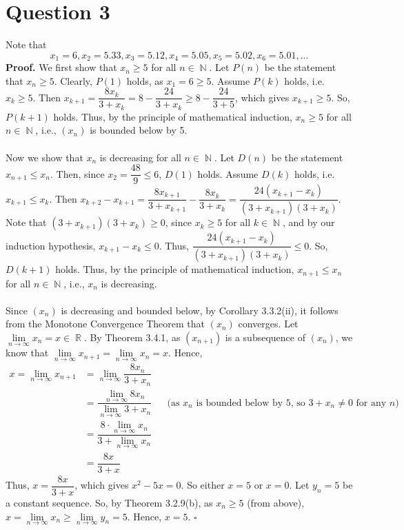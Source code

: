 \documentclass[a4paper,11pt]{article}
\renewenvironment{proof}{{\bfseries Proof.}}{\hfill $\square$}
\DeclareMathOperator{\R}{\mathbb{R}}
\DeclareMathOperator{\N}{\mathbb{N}}
\begin{document}
\section{Question 3}
Note that $$x_1 = 6, x_2 = 5.33, x_3 = 5.12, x_4 = 5.05, x_5 = 5.02, x_6 = 5.01, ...$$  
\begin{proof} 
We first show that $x_n \geq 5$ for all $n \in \N$. Let $P(n)$ be the statement that $x_n \geq 5$. Clearly, $P(1)$ holds, as $x_{1} = 6 \geq 5$. Assume $P(k)$ holds, i.e. $x_k \geq 5$. Then $x_{k+1} = \dfrac{8x_k}{3+x_k} = 8 - \dfrac{24}{3+x_k} \geq 8 - \dfrac{24}{3+5}$, which gives $x_{k+1} \geq 5$. So, $P(k+1)$ holds. Thus, by the principle of mathematical induction,  $x_n \geq 5$ for all $n \in \N$, i.e., $(x_n)$ is bounded below by 5. \\\\
Now we show that $x_n$ is decreasing for all $n \in \N$. Let $D(n)$ be the statement $x_{n+1} \leq x_{n}$. Then, since $x_2 = \dfrac{48}{9} \leq 6$, $D(1)$ holds. Assume $D(k)$ holds, i.e. $x_{k+1} \leq x_{k}$. Then $x_{k+2} - x_{k+1} = \dfrac{8x_{k+1}}{3+x_{k+1}} - \dfrac{8x_{k}}{3+x_{k}} = \dfrac{24(x_{k+1}-x_{k})}{(3+x_{k+1})(3+x_{k})}$. Note that $(3+x_{k+1})(3+x_{k}) \geq 0$, since $x_k \geq 5$ for all $k \in \N$, and by our induction hypothesis, $x_{k+1}-x_{k} \leq 0$. Thus, $\dfrac{24(x_{k+1}-x_{k})}{(3+x_{k+1})(3+x_{k})} \leq 0$. So, $D(k+1)$ holds. Thus, by the principle of mathematical induction,  $x_{n+1} \leq x_{n}$ for all $n \in \N$, i.e., $x_n$ is decreasing. \\\\
Since $(x_n)$ is decreasing and bounded below, by Corollary 3.3.2(ii), it follows from the Monotone Convergence Theorem that $(x_n)$ converges. Let $\lim\limits_{n \to \infty}{x_{n}} = x \in \R$. By Theorem 3.4.1, as $(x_{n+1})$ is a subsequence of $(x_n)$, we know that  $\lim\limits_{n \to \infty}{x_{n+1}} = \lim\limits_{n \to \infty}{x_{n}} = x$. Hence,
\begin{align*}
x = \lim\limits_{n \to \infty}{x_{n+1}} &= \lim\limits_{n \to \infty}{\dfrac{8x_n}{3+x_n}} \\
&= \dfrac{\lim\limits_{n \to \infty}{8x_n}}{\lim\limits_{n \to \infty}{3+x_n}} && \text{(as $x_n$ is bounded below by 5, so $3+x_n \neq 0$ for any $n$)} \\
&= \dfrac{8\cdot\lim\limits_{n \to \infty}{x_n}}{3+\lim\limits_{n \to \infty}{x_n}} \\
&= \dfrac{8x}{3+x} 
\end{align*} 
Thus, $x = \dfrac{8x}{3+x}$, which gives $x^2-5x = 0$. So either $x = 5$ or $x = 0$. Let $y_n = 5$ be a constant sequence. So, by Theorem 3.2.9(b), as $x_n \geq 5$ (from above), $x = \lim\limits_{n \to \infty}{x_{n}} \geq \lim\limits_{n \to \infty}{y_{n}} = 5$. Hence, $x = 5$.
\end{proof}
\end{document}
